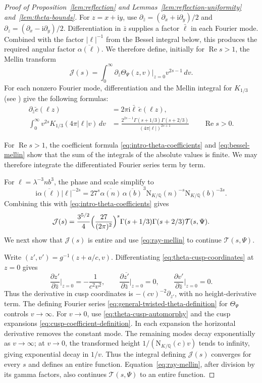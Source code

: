 \documentclass[11pt,a4paper]{article}
\numberwithin{equation}{section}
\numberwithin{figure}{section}
\theoremstyle{definition}
\theoremstyle{remark}
\newcommand{\Q}{\mathbb Q}
\newcommand{\NK}{\mathrm N_{K/\Q}}
\newcommand{\Rea}{\operatorname{Re}}
\newcommand{\dd}{\,d}
\begin{document}
\begin{proof}[Proof of Proposition~\ref{lem:reflection} and Lemmas~\ref{lem:reflection-uniformity} and~\ref{lem:theta-bounds}]
For $z=x+\mathrm i y$, use $\partial_{\bar z}=(\partial_x+\mathrm i\partial_y)/2$ and $\partial_z=(\partial_x-\mathrm i\partial_y)/2$. Differentiation in $\bar z$ supplies a factor $\bar\ell$ in each Fourier mode. Combined with the factor $|\ell|^{-1}$ from the
Bessel integral below, this produces the required angular factor
$\overline{\alpha(\ell)}$. We therefore define, initially for $\Rea s>1$,
the Mellin transform
\[
 \mathcal J(s)=\int_0^\infty
 \partial_{\bar z}\Theta_\Psi(z,v)\Bigr|_{z=0}
 v^{2s-1}\dd v.
\]
For each nonzero Fourier mode, differentiation and the Mellin
integral for $K_{1/3}$ (see \cite[(10.43.19)]{DLMF}) give the following formulas:
\begin{align}
 \partial_{\bar z}\breve e(\ell z)
   &=2\pi \mathrm i\bar\ell\,\breve e(\ell z),\label{eq:fourier-derivative}\\
 \int_0^\infty v^{2s}K_{1/3}(4\pi|\ell|v)\dd v
   &=\frac{2^{2s-1}\Gamma(s+1/3)\Gamma(s+2/3)}
          {(4\pi|\ell|)^{2s+1}} \label{eq:bessel-mellin} \qquad \Rea s>0.
\end{align}

For $\Rea s>1$, the coefficient formula
\eqref{eq:intro-theta-coefficients} and \eqref{eq:bessel-mellin}
show that the sum of the integrals of the absolute values is finite.
We may therefore integrate the differentiated Fourier series
term by term.

For \(\ell=\lambda^{-3}nb^3\), the phase and scale simplify to
\[
 \mathrm i\overline{\alpha(\ell)}|\ell|^{-2s}
  =27^s\overline{\alpha(n)}\,
   \overline{\alpha(b)}^{\,3}\NK(n)^{-s}\NK(b)^{-3s}.
\]
Combining this with \eqref{eq:intro-theta-coefficients} gives
\begin{equation}\label{eq:ray-mellin}
\mathcal J(s)=\frac{3^{5/2}}4
       \Bigl(\frac{27}{(2\pi)^2}\Bigr)^s
       \Gamma(s+1/3)\Gamma(s+2/3)\mathcal T(s,\Psi).
\end{equation}
We next show that $\mathcal J(s)$ is entire and use
\eqref{eq:ray-mellin} to continue $\mathcal T(s,\Psi)$.

Write $(z',v')=g^{-1}(z+a/c,v)$. Differentiating
\eqref{eq:theta-cusp-coordinates} at $z=0$ gives
\[
 \frac{\partial z'}{\partial\bar z}\bigg|_{z=0}
   =-\frac1{c^2v^2},
 \qquad
 \frac{\partial\overline{z'}}{\partial\bar z}\bigg|_{z=0}=0,
 \qquad
 \frac{\partial v'}{\partial\bar z}\bigg|_{z=0}=0.
\]
Thus the derivative in cusp coordinates is
$-(cv)^{-2}\partial_{z'}$, with no height-derivative term. The defining Fourier series
\eqref{eq:general-twisted-theta-definition}
for $\Theta_\Psi$ controls $v\to\infty$. For $v\to0$, use
\eqref{eq:theta-cusp-automorphy} and the cusp expansions
\eqref{eq:cusp-coefficient-definition}.
In each expansion the horizontal derivative removes the constant
mode. The remaining modes decay exponentially as $v\to\infty$;
at $v\to0$, the transformed height $1/(\NK(c)v)$ tends to infinity,
giving exponential decay in $1/v$. Thus the integral defining $\mathcal J(s)$
converges for every $s$ and defines an entire function.
Equation~\eqref{eq:ray-mellin}, after division by its gamma factors,
also continues $\mathcal T(s,\Psi)$ to an entire function.


\end{proof}
\end{document}

